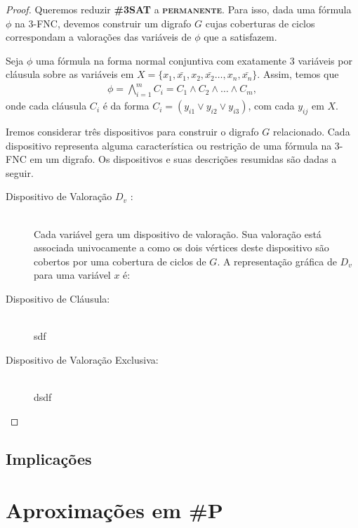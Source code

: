 \documentclass[paper=a4, fontsize=11pt]{scrartcl} %
\newcommand{\SP}{\textbf{\#P}\xspace}
\newcommand{\prob}[1]{\textsc{\textbf{#1}}}
\begin{document}
\begin{proof}

Queremos reduzir \prob{\#3SAT} a \prob{permanente}. Para isso, dada uma fórmula $\phi$ na 3-FNC, devemos construir um digrafo $ G $ cujas coberturas de ciclos correspondam a valorações das variáveis de $\phi$ que a satisfazem.

Seja $\phi$ uma fórmula na forma normal conjuntiva com exatamente 3 variáveis por cláusula sobre as variáveis em $ X = \{x_1, \bar{x_1}, x_2, \bar{x_2} \dots, x_n, \bar{x_n} \} $. Assim, temos que
\begin{align*}
\phi = \bigwedge\limits_{i = 1}^{m}C_i = C_1 \land C_2 \land \dots \land C_m,
\end{align*}
onde cada cláusula $C_i$ é da forma $C_i = (y_{i1} \lor y_{i2} \lor y_{i3} )$, com cada $y_{ij}$ em $X$.

Iremos considerar três dispositivos para construir o digrafo $ G $ relacionado. Cada dispositivo representa alguma característica ou restrição de uma fórmula na 3-FNC em um digrafo. Os dispositivos e suas descrições resumidas são dadas a seguir.

\begin{description}
  \item[Dispositivo de Valoração $D_v$ :] \hfill \\
      Cada variável gera um dispositivo de valoração. Sua valoração está associada univocamente a como os dois vértices deste dispositivo são cobertos por uma cobertura de ciclos de $G$. A representação gráfica de $D_v$ para uma variável $x$ é:
      
      
      
  \item[Dispositivo de Cláusula:] \hfill \\
    sdf
  \item[Dispositivo de Valoração Exclusiva:] \hfill \\
    dsdf
\end{description}



\end{proof}



\subsection{Implicações}

\pagebreak
\section{Aproximações em \SP}
\end{document}
